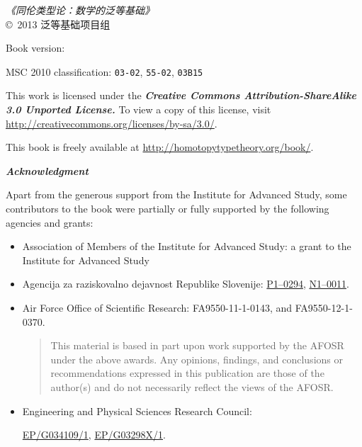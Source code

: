 \hbox{}
\vfill

{\small
\noindent
\emph{《同伦类型论：数学的泛等基础》}\\
\copyright\ 2013 泛等基础项目组

\medskip
\noindent
Book version: \texttt{\OPTversion}

\medskip
\noindent
MSC 2010 classification:
\texttt{03-02},
\texttt{55-02},
\texttt{03B15}

\bigskip
\footnotesize

\noindent
This work is licensed under the
\textbf{\emph{Creative Commons Attribution-ShareAlike 3.0 Unported License.}}
%
To view a copy of this license, visit
\url{http://creativecommons.org/licenses/by-sa/3.0/}.

\bigskip

\noindent
This book is freely available at \url{http://homotopytypetheory.org/book/}.

\bigskip

\noindent
\emph{\textbf{\small Acknowledgment}}

\medskip

\noindent
Apart from the generous support from the Institute for Advanced Study, some contributors
to the book were partially or fully supported by the following agencies and grants:
%
\begin{itemize}
\item Association of Members of the Institute for Advanced Study: a grant to the Institute for Advanced Study %
\item Agencija za raziskovalno dejavnost Republike Slovenije:  %
\href{http://www.sicris.si/search/prg.aspx?id=6120}{P1--0294},
\href{http://www.sicris.si/search/prj.aspx?id=7109}{N1--0011}.

\item Air Force Office of Scientific Research:
  FA9550-11-1-0143, and %
  FA9550-12-1-0370.  %
  {
    \setlength{\parskip}{0pt}
    \begin{quote}
      \noindent\scriptsize
      This material is based in part upon work supported by the AFOSR under the above awards.
      Any opinions, findings, and conclusions or recommendations expressed in this publication are those of the author(s) and do not necessarily reflect the views of the AFOSR.
    \end{quote}
  }

\item Engineering and Physical Sciences Research Council: %
  \par\noindent
   \href{http://gow.epsrc.ac.uk/NGBOViewGrant.aspx?GrantRef=EP/G034109/1}{EP/G034109/1}, %
   \href{http://gow.epsrc.ac.uk/NGBOViewGrant.aspx?GrantRef=EP/G03298X/1}{EP/G03298X/1}. %


\end{itemize}}

